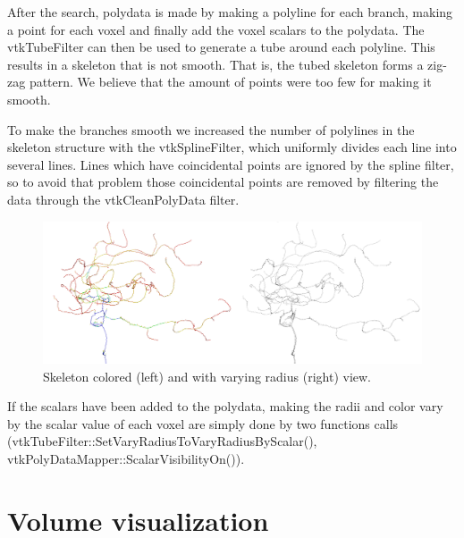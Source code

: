 After the search, polydata is made by making a polyline for each branch, making a point for each voxel and finally add the voxel scalars to the polydata. The vtkTubeFilter can then be used to generate a tube around each polyline. This results in a skeleton that is not smooth. That is, the tubed skeleton forms a zig-zag pattern. We believe that the amount of points were too few for making it smooth.

To make the branches smooth we increased the number of polylines in the skeleton structure with the vtkSplineFilter, which uniformly divides each line into several lines. Lines which have coincidental points are ignored by the spline filter, so to avoid that problem those coincidental points are removed by filtering the data through the vtkCleanPolyData filter.

\begin{figure}
	\centering
	\includegraphics[scale=0.35]{fig/skeleton-colored-radius}
	\caption{Skeleton colored (left) and with varying radius (right) view.}\label{fig:skeleton-colored-radius}
\end{figure}

If the scalars have been added to the polydata, making the radii and color vary by the scalar value of each voxel are simply done by two functions calls (vtkTubeFilter::SetVaryRadiusToVaryRadiusByScalar(), vtkPolyDataMapper::ScalarVisibilityOn()).

\section{Volume visualization}

